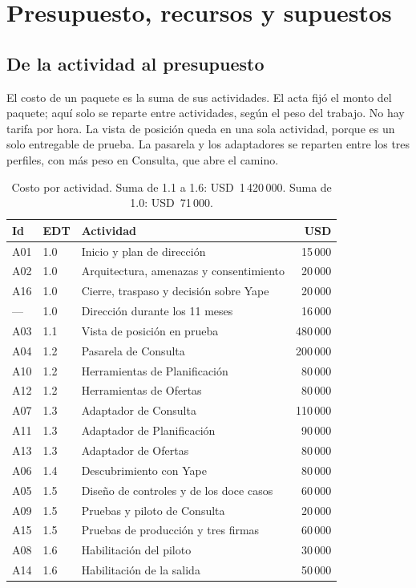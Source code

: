 \documentclass[11pt,a4paper]{article}
\newcommand{\usd}[1]{USD~#1}
\begin{document}
\section{Presupuesto, recursos y supuestos}

\subsection{De la actividad al presupuesto}

El costo de un paquete es la suma de sus actividades. El acta fijó el monto del paquete; aquí solo se reparte entre actividades, según el peso del trabajo. No hay tarifa por hora. La vista de posición queda en una sola actividad, porque es un solo entregable de prueba. La pasarela y los adaptadores se reparten entre los tres perfiles, con más peso en Consulta, que abre el camino.

\begin{table}[H]
\centering
\caption{Costo por actividad. Suma de 1.1 a 1.6: \usd{1\,420\,000}. Suma de 1.0: \usd{71\,000}.}
\footnotesize
\setlength{\tabcolsep}{4pt}
\begin{tabularx}{\textwidth}{@{}l l X r@{}}
\toprule
\textbf{Id} & \textbf{EDT} & \textbf{Actividad} & \textbf{USD} \\
\midrule
A01 & 1.0 & Inicio y plan de dirección & 15\,000 \\
A02 & 1.0 & Arquitectura, amenazas y consentimiento & 20\,000 \\
A16 & 1.0 & Cierre, traspaso y decisión sobre Yape & 20\,000 \\
--- & 1.0 & Dirección durante los 11 meses & 16\,000 \\
A03 & 1.1 & Vista de posición en prueba & 480\,000 \\
A04 & 1.2 & Pasarela de Consulta & 200\,000 \\
A10 & 1.2 & Herramientas de Planificación & 80\,000 \\
A12 & 1.2 & Herramientas de Ofertas & 80\,000 \\
A07 & 1.3 & Adaptador de Consulta & 110\,000 \\
A11 & 1.3 & Adaptador de Planificación & 90\,000 \\
A13 & 1.3 & Adaptador de Ofertas & 80\,000 \\
A06 & 1.4 & Descubrimiento con Yape & 80\,000 \\
A05 & 1.5 & Diseño de controles y de los doce casos & 60\,000 \\
A09 & 1.5 & Pruebas y piloto de Consulta & 20\,000 \\
A15 & 1.5 & Pruebas de producción y tres firmas & 60\,000 \\
A08 & 1.6 & Habilitación del piloto & 30\,000 \\
A14 & 1.6 & Habilitación de la salida & 50\,000 \\
\bottomrule
\end{tabularx}
\end{table}
\end{document}
